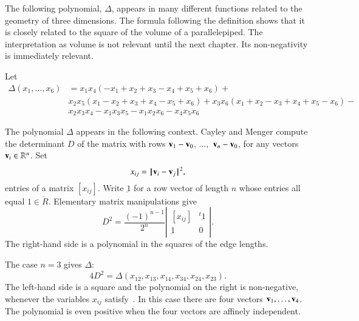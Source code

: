 The following polynomial, $\Delta$,  appears in many different functions related to the geometry of three dimensions.  The formula following the definition shows that it is closely related to the square of the volume of a parallelepiped.  The interpretation as  volume is not relevant until the next chapter.  Its non-negativity is immediately relevant. 
%

\begin{definition}[$\Delta$]\label{def:delta}  Let 
$$
\begin{array}{lll}
\Delta(x_1,\ldots,x_6) &= x_1 x_4 (- x_1+x_2+x_3- x_4+x_5+x_6)+\\&
            x_2 x_5 (x_1- x_2+x_3+x_4- x_5+x_6)
            +x_3 x_6 (x_1+x_2- x_3+x_4+x_5- x_6)
            - \\&x_2 x_3 x_4- x_1 x_3 x_5- x_1 x_2 x_6- x_4 x_5 x_6
\end{array}
$$
\end{definition}
%
%

The polynomial $\Delta$ appears in the following context.
Cayley and Menger compute the determinant $D$ of the
matrix with rows ${\mathbf v}_1-{\mathbf v}_0$, $\ldots,$ ${\mathbf v}_n-{\mathbf v}_0$, 
for any vectors ${\mathbf v}_i\in\mathbb{R}^n$.   Set
\begin{equation}\label{eqn:xij}
x_{ij} = {\hskip0.1em|\hskip-0.15em|\hskip0.1em}{\mathbf v}_i - {\mathbf v}_j{\hskip0.1em|\hskip-0.15em|\hskip0.1em}^2,
\end{equation}
entries of a matrix $[x_{ij}]$.
Write $\underbar 1$ for a row vector of length $n$ 
whose entries all equal $1\in\ring{R}$.
Elementary matrix manipulations give
$$
D^2 = \frac{(-1)^{n-1}}{2^n}
    \left|\begin{matrix}[x_{ij}]& {}^t{\underbar 1}\\ {\underbar 1}& 0
        \end{matrix}\right|.
$$
The right-hand side is a polynomial in the squares of the edge lengths.

The case $n=3$ gives $\Delta$:
$$
4 D^2 = \Delta(x_{12},x_{13},x_{14},x_{34},x_{24},x_{23}).
$$
The
left-hand side is a square and the polynomial on the right is
non-negative, whenever the variables $x_{ij}$ satisfy~.  In this case there 
are four vectors ${\mathbf v}_1,\ldots,{\mathbf v}_4$.  
The polynomial is even positive when the four vectors are affinely independent.
%
%
%
%


